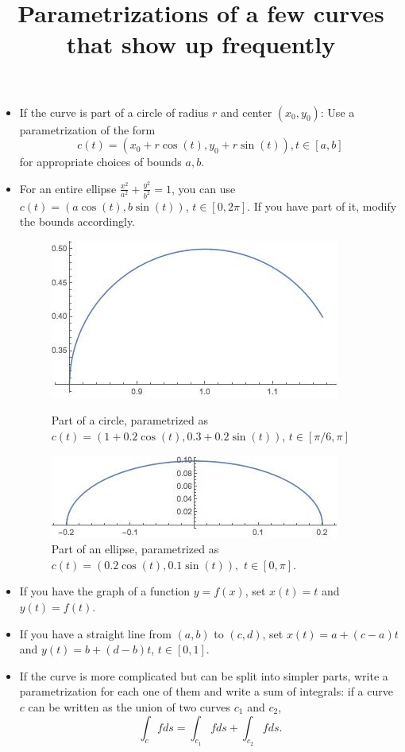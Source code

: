 \documentclass[12pt]{article}
\title{Parametrizations of a few curves that show up frequently}
\begin{document}
\maketitle
\begin{itemize}
\item If the curve is part of a circle of radius $r$ and center $(x_0,y_0)$: Use a parametrization of the form $$c(t)=(x_0+r\cos(t),y_0+r\sin(t)), t\in[a,b]$$ for appropriate choices of bounds $a, b$.

\item For an entire ellipse $\frac{x^2}{a^2}+\frac{y^2}{b^2}=1$, you can use $c(t)=(a\cos(t),b\sin(t))$, $t\in[0,2\pi]$. If you have part of it, modify the bounds accordingly.


\begin{figure}
\centering
\parbox{5cm}{
\includegraphics[scale=.3]{circle.jpeg}
\caption{Part of a circle, parametrized as $c(t)=(1+0.2\cos(t),0.3+0.2\sin(t))$, $t\in[\pi/6,\pi]$}
\label{fig1}}
\qquad
\begin{minipage}{5cm}
\includegraphics[scale=.3]{ellipse.jpeg}
\caption{Part of an ellipse, parametrized as $c(t)=(0.2\cos(t),0.1\sin(t)),$ $t\in[0,\pi]$.}
\label{fig2}
\end{minipage}
\end{figure}



\item If you have the graph of a function $y=f(x)$, set $x(t)=t$ and $y(t)=f(t)$.

\item If you have a straight line from $(a,b)$ to $(c,d)$, set $x(t)=a+(c-a)t$ and $y(t)=b+(d-b)t$, $t\in [0,1]$.
\item If the curve is more complicated but can be split into simpler parts, write a parametrization for each one of them and write a sum of integrals: if a curve $c$ can be written as the union of two curves $c_1$ and $c_2$, $$\int_c f ds=\int_{c_1}f ds+\int_{c_2} f ds.$$


\end{itemize}
\end{document}
